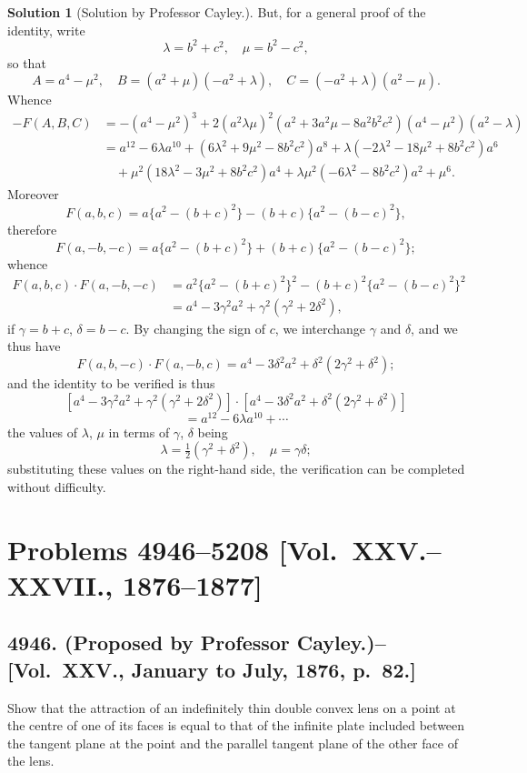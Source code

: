 \documentclass[11pt,a4paper]{article}
\theoremstyle{definition}
\newtheorem*{solution}{Solution}
\begin{document}
\begin{solution}[Solution by Professor Cayley.]
But, for a general proof of the identity, write
\[
\lambda = b^2+c^2, \quad \mu = b^2-c^2,
\]
so that
\[
A = a^4-\mu^2, \quad B = (a^2+\mu)(-a^2+\lambda), \quad C = (-a^2+\lambda)(a^2-\mu).
\]
Whence
\[
\begin{aligned}
-F(A,B,C) &= -(a^4-\mu^2)^3 + 2(a^2\lambda\mu)^2(a^2+3a^2\mu-8a^2b^2c^2)(a^4-\mu^2)(a^2-\lambda) \\
&= a^{12} - 6\lambda a^{10} + (6\lambda^2+9\mu^2-8b^2c^2)a^8 + \lambda(-2\lambda^2-18\mu^2+8b^2c^2)a^6 \\
&\quad + \mu^2(18\lambda^2-3\mu^2+8b^2c^2)a^4 + \lambda\mu^2(-6\lambda^2-8b^2c^2)a^2 + \mu^6.
\end{aligned}
\]
Moreover
\[
F(a,b,c) = a\{a^2-(b+c)^2\} - (b+c)\{a^2-(b-c)^2\},
\]
therefore
\[
F(a,-b,-c) = a\{a^2-(b+c)^2\} + (b+c)\{a^2-(b-c)^2\};
\]
whence
\[
\begin{aligned}
F(a,b,c) \cdot F(a,-b,-c) &= a^2\{a^2-(b+c)^2\}^2 - (b+c)^2\{a^2-(b-c)^2\}^2 \\
&= a^4 - 3\gamma^2 a^2 + \gamma^2(\gamma^2+2\delta^2),
\end{aligned}
\]
if $\gamma = b+c$, $\delta = b-c$. By changing the sign of $c$, we interchange $\gamma$ and $\delta$, and we thus have
\[
F(a,b,-c) \cdot F(a,-b,c) = a^4 - 3\delta^2 a^2 + \delta^2(2\gamma^2+\delta^2);
\]
and the identity to be verified is thus
\[
[a^4 - 3\gamma^2 a^2 + \gamma^2(\gamma^2+2\delta^2)] \cdot [a^4 - 3\delta^2 a^2 + \delta^2(2\gamma^2+\delta^2)]
\]
\[
= a^{12} - 6\lambda a^{10} + \cdots
\]
the values of $\lambda$, $\mu$ in terms of $\gamma$, $\delta$ being
\[
\lambda = \tfrac{1}{2}(\gamma^2+\delta^2), \quad \mu = \gamma\delta;
\]
substituting these values on the right-hand side, the verification can be completed without difficulty.
\end{solution}

\newpage

\section*{Problems 4946--5208 [Vol.~XXV.--XXVII., 1876--1877]}

\subsection*{4946. (Proposed by Professor Cayley.)\---[Vol.~XXV., January to July, 1876, p.~82.]}

Show that the attraction of an indefinitely thin double convex lens on a point at the centre of one of its faces is equal to that of the infinite plate included between the tangent plane at the point and the parallel tangent plane of the other face of the lens.
\end{document}
